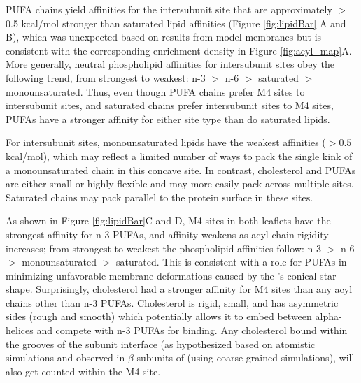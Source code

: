 PUFA chains yield affinities for the intersubunit site that are approximately $>$0.5 kcal/mol stronger than saturated lipid affinities (Figure \ref{fig:lipidBar} A and B), which was unexpected based on results from model membranes but is consistent with the corresponding enrichment density in Figure \ref{fig:acyl_map}A. More generally, neutral phospholipid affinities for intersubunit sites obey the following trend, from strongest to weakest: n-3 $>$ n-6 $>$ saturated $>$ monounsaturated. Thus, even though PUFA chains prefer M4 sites to intersubunit sites,  and saturated chains prefer intersubunit sites to M4 sites, PUFAs have a stronger affinity for either site type than do saturated lipids. 
 
For intersubunit sites, monounsaturated lipids have the weakest affinities ($>0.5$ kcal/mol), which may reflect a limited number of ways to pack the single kink of a monounsaturated chain in this concave site. In contrast, cholesterol and PUFAs are either small or highly flexible and may more easily pack across multiple sites. Saturated chains may pack parallel to the protein surface in these sites. 

As shown in Figure \ref{fig:lipidBar}C and D, M4 sites in both leaflets have the strongest affinity for n-3 PUFAs, and affinity weakens as acyl chain rigidity increases; from strongest to weakest the phospholipid affinities follow: n-3 $>$ n-6 $>$ monounsaturated $>$ saturated.  This is consistent with a role for PUFAs in minimizing unfavorable membrane deformations caused by the \plgic's conical-star shape.\cite{Brannigan2007,Kim1998,Dan1993,Goulian1996,Goulian1993,Fournier2015}  Surprisingly, cholesterol had a stronger affinity for M4 sites than any acyl chains other than n-3 PUFAs. Cholesterol is rigid, small, and has asymmetric sides (rough and smooth) which potentially allows it to embed between alpha-helices and compete with n-3 PUFAs for binding. Any cholesterol bound within the grooves of the subunit interface (as hypothesized based on atomistic simulations\cite{Brannigan2008} and observed in $\beta$ subunits  of \nachr{} (using coarse-grained simulations\cite{Sharp2019}), will also get counted within the M4 site.   %

